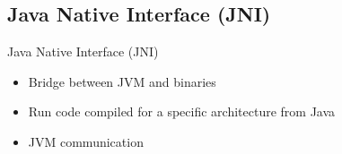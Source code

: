 \documentclass[xcolor={table}]{beamer}
\begin{document}
\subsection{Java Native Interface (JNI)}
\begin{frame}{Java Native Interface (JNI)}
    \begin{itemize}
        \item Bridge between JVM and binaries
        \item Run code compiled for a specific architecture from Java
        \item JVM communication
    \end{itemize}
\end{frame}
\end{document}
